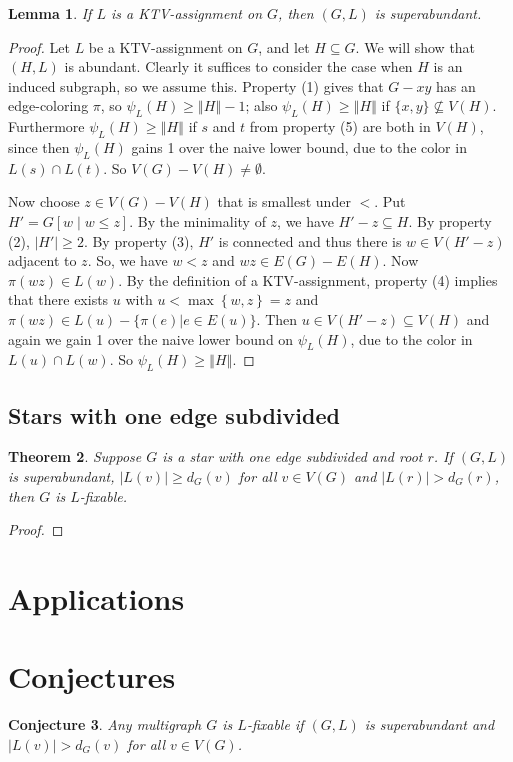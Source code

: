 \documentclass[12pt]{article}
\theoremstyle{plain}
\newtheorem{thm}{Theorem}[section]
\newtheorem{lem}[thm]{Lemma}
\newtheorem{conjecture}[thm]{Conjecture}
\theoremstyle{definition}
\theoremstyle{remark}
\newcommand{\set}[1]{\left\{ #1 \right\}}
\newcommand{\card}[1]{\left|#1\right|}
\newcommand{\size}[1]{\left\Vert#1\right\Vert}
\newcommand{\brackets}[1]{\left[ #1 \right]}
\begin{document}
\begin{lem}\label{KTVImpliesSuperabundant}
If $L$ is a KTV-assignment on $G$, then $(G, L)$ is superabundant.
\end{lem}
\begin{proof}
Let $L$ be a KTV-assignment on $G$, and let $H \subseteq G$.  We will show that
$(H,L)$ is abundant.  
Clearly it suffices to consider the case when $H$ is an induced subgraph, so we
assume this.
Property (1) gives that $G-xy$ has an edge-coloring
$\pi$, so $\psi_L(H)\ge \size{H}-1$; also $\psi_L(H)\ge \size{H}$ if
$\{x,y\}\not\subseteq V(H)$.  Furthermore $\psi_L(H)\ge \size{H}$ if $s$ and
$t$ from property (5) are both in $V(H)$, since then $\psi_L(H)$ gains 1 over
the naive lower bound, due to the color in $L(s)\cap L(t)$.  So $V(G)-
V(H)\ne \emptyset$.

Now choose $z \in V(G) - V(H)$ that is smallest under $<$.  
Put $H' = G\brackets{w \mid w \le z}$.  By the minimality of $z$, we have $H' - z \subseteq H$. By property (2), $\card{H'} \ge 2$.  
By property (3), $H'$ is connected and thus there is $w \in V(H' - z)$ adjacent to $z$. So, we have $w < z$ and $wz\in E(G)-E(H)$.
Now $\pi(wz)\in L(w)$.  By the definition of a KTV-assignment, 
property (4) implies that there exists $u$ with $u < \max\set{w, z} = z$ and $\pi(wz) \in
L(u)-\{\pi(e)|e\in E(u)\}$.  Then $u \in V(H' - z) \subseteq V(H)$ and
again we gain 1 over the naive lower bound on $\psi_L(H)$, due to the color
in $L(u)\cap L(w)$.  So $\psi_L(H)\ge \size{H}$.
\end{proof}

\subsection{Stars with one edge subdivided}
\begin{thm}
Suppose $G$ is a star with one edge subdivided and root $r$. If $(G, L)$ is superabundant, $|L(v)| \ge d_G(v)$ for all $v \in V(G)$ and $|L(r)| > d_G(r)$, then $G$ is $L$-fixable.
\end{thm}
\begin{proof}

\end{proof}
\section{Applications}

\section{Conjectures}
\begin{conjecture}
Any multigraph $G$ is $L$-fixable if $(G, L)$ is superabundant and $|L(v)| > d_G(v)$ for all $v \in V(G)$.
\end{conjecture}
\end{document}
